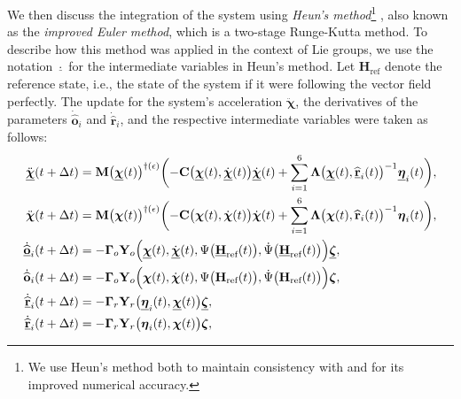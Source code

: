 We then discuss the integration of the system using \emph{Heun's method}\footnote{We use Heun's method both to maintain consistency with \citet{Culbertson2021} and for its improved numerical accuracy.} \citep[p. 330]{fred2007algoritmos}, also known as the \emph{improved Euler method}, which is a two-stage Runge-Kutta method. To describe how this method was applied in the context of Lie groups, we use the notation $\underline{\cdot}$ for the intermediate variables in Heun's method. Let $\mathbf{H}_\text{ref}$ denote the reference state, i.e., the state of the system if it were following the vector field perfectly. The update for the system's acceleration $\ddot{\boldsymbol{\chi}}$, the derivatives of the parameters $\dot{\widehat{\mathbf{o}}}_i$ and $\dot{\widehat{\mathbf{r}}}_i$, and the respective intermediate variables were taken as follows:
\begin{align}
    \begin{split}
        \ddot{\underline{\boldsymbol{\chi}}}(t+\Delta t) &= \mathbf{M}\bigl(\underline{\boldsymbol{\chi}}(t)\bigr)^{\dagger(\epsilon)}\biggl(-\mathbf{C}\bigl(\underline{\boldsymbol{\chi}}(t), \underline{\dot{\boldsymbol{\chi}}}(t)\bigr)\underline{\dot{\boldsymbol{\chi}}}(t)  + \sum_{i=1}^6 \boldsymbol{\Lambda}\bigl(\underline{\boldsymbol{\chi}}(t), \underline{\widehat{\mathbf{r}}}_i(t)\bigr)^{-1}\underline{\boldsymbol{\eta}}_i(t)\biggr),\\
        \ddot{{\boldsymbol{\chi}}}(t+\Delta t) &= \mathbf{M}\bigl({\boldsymbol{\chi}}(t)\bigr)^{\dagger(\epsilon)}\biggl(-\mathbf{C}\bigl({\boldsymbol{\chi}}(t), {\dot{\boldsymbol{\chi}}}(t)\bigr)\dot{\boldsymbol{\chi}}(t)  + \sum_{i=1}^6 \boldsymbol{\Lambda}\bigl({\boldsymbol{\chi}}(t), {\widehat{\mathbf{r}}}_i(t)\bigr)^{-1}{\boldsymbol{\eta}}_i(t)\biggr),\\
        \underline{\dot{\widehat{\mathbf{o}}}}_i(t + \Delta t) &= -\boldsymbol{\Gamma}_o\mathbf{Y}_o\Bigl(\underline{\boldsymbol{\chi}}(t), \underline{\dot{\boldsymbol{\chi}}}(t), \Psi\bigl(\underline{\mathbf{H}}_\text{ref}(t)\bigr), \dot{\Psi}\bigl(\underline{\mathbf{H}}_\text{ref}(t)\bigr)\Bigr)\underline{\boldsymbol{\zeta}},\\
        {\dot{\widehat{\mathbf{o}}}}_i(t + \Delta t) &= -\boldsymbol{\Gamma}_o\mathbf{Y}_o\Bigl({\boldsymbol{\chi}}(t), {\dot{\boldsymbol{\chi}}}(t), \Psi\bigl({\mathbf{H}_\text{ref}}(t)\bigr), \dot{\Psi}\bigl({\mathbf{H}_\text{ref}}(t)\bigr)\Bigr){\boldsymbol{\zeta}},\\
        \underline{\dot{\widehat{\mathbf{r}}}}_i(t + \Delta t) &= -\boldsymbol{\Gamma}_r\mathbf{Y}_r\bigl(\underline{\boldsymbol{\eta}}_i(t), \underline{\boldsymbol{\chi}}(t)\bigr)\underline{\boldsymbol{\zeta}},\\
        \underline{\dot{\widehat{\mathbf{r}}}}_i(t + \Delta t) &= -\boldsymbol{\Gamma}_r\mathbf{Y}_r\bigl({\boldsymbol{\eta}}_i(t), {\boldsymbol{\chi}}(t)\bigr){\boldsymbol{\zeta}},
    \end{split}
\end{align}

